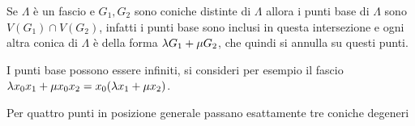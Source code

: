 \begin{multicols*}{2}
    \begin{remark}
    Se $\Lambda$ \`e un fascio e $G_1,G_2$ sono coniche distinte di $\Lambda$ allora i punti base di $\Lambda$ sono $V(G_1)\cap V(G_2)$, infatti i punti base sono inclusi in questa intersezione e ogni altra conica di $\Lambda$ \`e della forma $\lambda G_1+\mu G_2$, che quindi si annulla su questi punti.
    \end{remark}

    \begin{remark}
    I punti base possono essere infiniti, si consideri per esempio il fascio $\lambda x_0x_1+\mu x_0x_2=x_0(\lambda x_1+\mu x_2)$.
    \end{remark}

    \begin{remark}
    Per quattro punti in posizione generale passano esattamente tre coniche degeneri
    \end{remark}










\end{multicols*}
